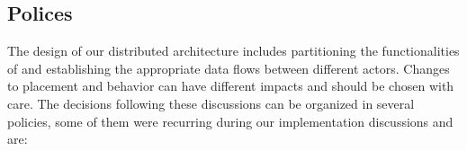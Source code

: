 \subsection{Polices}\label{sec:polices}

The design of our distributed \nd architecture includes partitioning the
functionalities of \minas and establishing the appropriate data flows
between different actors.
Changes to placement and behavior can have different impacts and should be
chosen with care.
% 
% 
The decisions following these discussions can be organized in several policies,
some of them were recurring during our implementation discussions and are:

